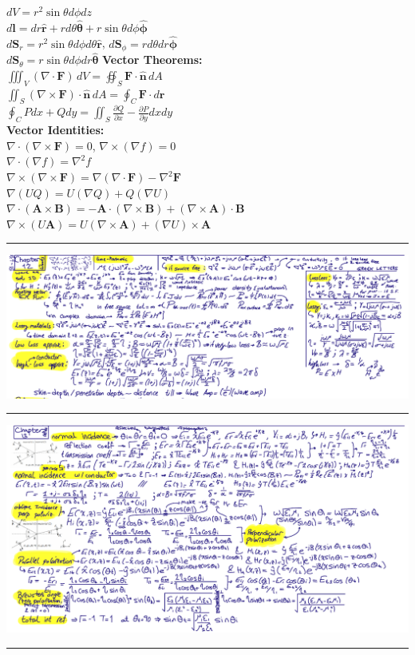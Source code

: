 \documentclass[12pt]{article}
\begin{document}
\begin{paracol}{3}
$dV = r^2 \sin \theta d\phi dz$ \\
$d\mathbf{l} = dr\mathbf{\hat r}+rd \theta \boldsymbol{\hat\theta}+r \sin \theta d \phi \boldsymbol{\hat\phi}$ \\
$d\mathbf{S}_r=r^2 \sin \theta d\phi d\theta \mathbf{\hat r}$, 
$d\mathbf{S}_\phi=r d \theta dr \boldsymbol{\hat \phi}$ \\
$d\mathbf{S}_\theta=r\sin\theta d\phi dr \boldsymbol{\hat \theta}$
\switchcolumn
\textbf{Vector Theorems:} \\
$\iiint_V (\nabla \cdot \mathbf{F}) \, dV = \oiint_S \mathbf{F} \cdot \hat{\mathbf{n}} \, dA$ \\
$\iint_S (\nabla \times \mathbf{F}) \cdot \hat{\mathbf{n}} \, dA = \oint_C \mathbf{F} \cdot d\mathbf{r}$ \\
\hspace*{-0.75em}$\oint_C Pdx+Qdy = \iint_S \frac{\partial Q}{\partial x} - \frac{\partial P}{\partial y} dxdy$\\
\textbf{Vector Identities:} \\
$\nabla \cdot (\nabla \times \mathbf{F}) = 0$, 
$\nabla \times (\nabla f) = 0$ \\
$\nabla \cdot (\nabla f) = \nabla^2 f$ \\
$\nabla \times (\nabla \times \mathbf{F}) = \nabla (\nabla \cdot \mathbf{F}) - \nabla^2 \mathbf{F}$ \\
$\nabla(U Q)=U(\nabla Q)+Q(\nabla U)$ \\
\hspace*{-3em}$\nabla \cdot(\mathbf{A} \times \mathbf{B}) =-\mathbf{A} \cdot(\nabla \times \mathbf{B})+(\nabla \times \mathbf{A}) \cdot \mathbf{B}$ \\
\hspace*{-3em}$\nabla \times(U \mathbf{A}) =U(\nabla \times \mathbf{A})+(\nabla U) \times \mathbf{A}$
\end{paracol}
\hrule

\includegraphics{pdfs/ch12fm.pdf}
\hrule
\includegraphics{pdfs/ch13fm.pdf}
\hrule

\end{document}
